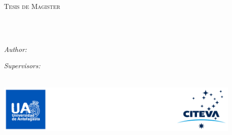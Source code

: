 \documentclass[letterpaper, english, 11pt]{MastersDoctoralThesis}  %
\author{Nombre \textsc{Apellidos}} %
\begin{document}
\frontmatter %

\pagestyle{plain} %


\begin{titlepage}
\begin{center}

\vspace*{.06\textheight}
{\scshape\LARGE \univname\par}\vspace{1.5cm} %
\textsc{\Large Tesis de Magister}\\[0.5cm] %

\HRule \\[0.4cm] %
{\huge \bfseries \ttitle\par}\vspace{0.4cm} %
\HRule \\[1.5cm] %
 
\begin{minipage}[t]{0.3\textwidth}
\begin{flushleft} \large
\emph{Author:}\\
{\authorname} %
\end{flushleft}
\end{minipage}
\begin{minipage}[t]{0.5\textwidth}
\begin{flushright} \large
\emph{Supervisors:} \\
{\supname} %
\end{flushright}
\end{minipage}\\[1.5cm]
 
\vfill
\centering
\includegraphics[width=0.9\textwidth]{images/portada/logos.pdf}\\[.5cm] %
% 
%  
\vfill


\end{center}
\end{titlepage}
\end{document}
